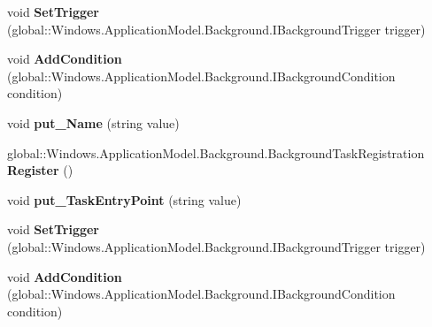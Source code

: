 \begin{DoxyCompactItemize}
void {\bfseries Set\+Trigger} (global\+::\+Windows.\+Application\+Model.\+Background.\+I\+Background\+Trigger trigger)
\item 
\mbox{\label{interface_windows_1_1_application_model_1_1_background_1_1_i_background_task_builder_aec7ccba5da7c8fc1b163a9871f3aba7c}} 
void {\bfseries Add\+Condition} (global\+::\+Windows.\+Application\+Model.\+Background.\+I\+Background\+Condition condition)
\item 
\mbox{\label{interface_windows_1_1_application_model_1_1_background_1_1_i_background_task_builder_a6afa1eee875932d0aededbdee329d0c9}} 
void {\bfseries put\+\_\+\+Name} (string value)
\item 
\mbox{\label{interface_windows_1_1_application_model_1_1_background_1_1_i_background_task_builder_a3ba4e67514edc80bd1d8315fdbef330f}} 
global\+::\+Windows.\+Application\+Model.\+Background.\+Background\+Task\+Registration {\bfseries Register} ()
\item 
\mbox{\label{interface_windows_1_1_application_model_1_1_background_1_1_i_background_task_builder_a1d8e55116fd36c44eafe3e116a59e6d5}} 
void {\bfseries put\+\_\+\+Task\+Entry\+Point} (string value)
\item 
\mbox{\label{interface_windows_1_1_application_model_1_1_background_1_1_i_background_task_builder_a6389795cf781758bafc44a855ab10489}} 
void {\bfseries Set\+Trigger} (global\+::\+Windows.\+Application\+Model.\+Background.\+I\+Background\+Trigger trigger)
\item 
\mbox{\label{interface_windows_1_1_application_model_1_1_background_1_1_i_background_task_builder_aec7ccba5da7c8fc1b163a9871f3aba7c}} 
void {\bfseries Add\+Condition} (global\+::\+Windows.\+Application\+Model.\+Background.\+I\+Background\+Condition condition)
\item 

\end{DoxyCompactItemize}
